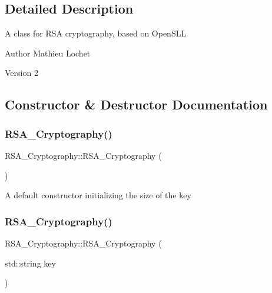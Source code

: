 \subsection{Detailed Description}
A class for R\+SA cryptography, based on Open\+S\+LL

\begin{DoxyAuthor}{Author}
Mathieu Lochet 
\end{DoxyAuthor}
\begin{DoxyVersion}{Version}
2 
\end{DoxyVersion}


\subsection{Constructor \& Destructor Documentation}
\mbox{\label{classRSA__Cryptography_aeca5b9b416a49fea20e7fc69ca18d641}} 
\subsubsection{\texorpdfstring{R\+S\+A\+\_\+\+Cryptography()}{RSA\_Cryptography()}\hspace{0.1cm}{\footnotesize\ttfamily [1/2]}}
{\footnotesize\ttfamily R\+S\+A\+\_\+\+Cryptography\+::\+R\+S\+A\+\_\+\+Cryptography (\begin{DoxyParamCaption}{ }\end{DoxyParamCaption})}

A default constructor initializing the size of the key \mbox{\label{classRSA__Cryptography_ae2cd6fb565102dc8007de9d305026e45}} 
\subsubsection{\texorpdfstring{R\+S\+A\+\_\+\+Cryptography()}{RSA\_Cryptography()}\hspace{0.1cm}{\footnotesize\ttfamily [2/2]}}
{\footnotesize\ttfamily R\+S\+A\+\_\+\+Cryptography\+::\+R\+S\+A\+\_\+\+Cryptography (\begin{DoxyParamCaption}\item[{std\+::string}]{key }\end{DoxyParamCaption})\hspace{0.3cm}{\ttfamily [explicit]}}

